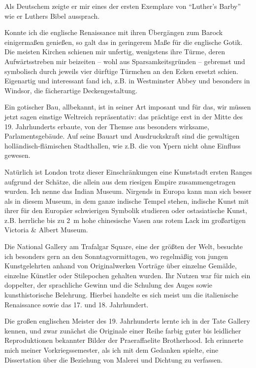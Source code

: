 Als Deutschem zeigte er mir eines der ersten Exemplare von \enquote{Luther's Barby} wie er Luthers Bibel aussprach.

Konnte ich die englische Renaissance mit ihren Übergängen zum Barock einigermaßen genießen, so galt das in geringerem Maße für die englische Gotik. Die meisten Kirchen schienen mir unfertig, wenigstens ihre Türme, deren Aufwärtsstreben mir beizeiten -- wohl aus Sparsamkeitsgründen -- gebremst und symbolisch durch jeweils vier dürftige Türmchen an den Ecken ersetzt schien. Eigenartig und interessant fand ich, z.B. in Westminster Abbey und besonders in Windsor, die fächerartige Deckengestaltung.

Ein gotischer Bau, allbekannt, ist in seiner Art imposant und für das, wir müssen jetzt sagen einstige Weltreich repräsentativ: das prächtige erst in der Mitte des 19. Jahrhunderts erbaute, von der Themse aus besonders wirksame, Parlamentsgebäude. Auf seine Bauart und Ausdruckskraft sind die gewaltigen holländisch-flämischen Stadthallen, wie z.B. die von Ypern nicht ohne Einfluss gewesen.

Natürlich ist London trotz dieser Einschränkungen eine Kunststadt ersten Ranges aufgrund der Schätze, die allein aus dem riesigen Empire zusammengetragen wurden. Ich nenne das Indian Museum. Nirgends in Europa kann man sich besser als in diesem Museum, in dem ganze indische Tempel stehen, indische Kunst mit ihrer für den Europäer schwierigen Symbolik studieren oder ostasiatische Kunst, z.B. herrliche bis zu 2~m hohe chinesische Vasen aus rotem Lack im großartigen Victoria \& Albert Museum.

Die National Gallery am Trafalgar Square, eine der größten der Welt, besuchte ich besonders gern an den Sonntagvormittagen, wo regelmäßig von jungen Kunstgelehrten anhand von Originalwerken Vorträge über einzelne Gemälde, einzelne Künstler oder Stilepochen gehalten wurden. Ihr Nutzen war für mich ein doppelter, der sprachliche Gewinn und die Schulung des Auges sowie kunsthistorische Belehrung. Hierbei handelte es sich meist um die italienische Renaissance sowie das 17. und 18. Jahrhundert.

Die großen englischen Meister des 19. Jahrhunderts lernte ich in der Tate Gallery kennen, und zwar zunächst die Originale einer Reihe farbig guter bis leidlicher Reproduktionen bekannter Bilder der Praeraffaelite Brotherhood. Ich erinnerte mich meiner Vorkriegssemester, als ich mit dem Gedanken spielte, eine Dissertation über die Beziehung von Malerei und Dichtung zu verfassen.

